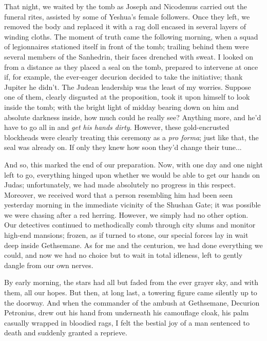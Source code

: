 That night, we waited by the tomb as Joseph and Nicodemus carried out the funeral rites, assisted by some of Yeshua's female followers. Once they left, we removed the body and replaced it with a rag doll encased in several layers of winding cloths. The moment of truth came the following morning, when a squad of legionnaires stationed itself in front of the tomb; trailing behind them were several members of the Sanhedrin, their faces drenched with sweat. I looked on from a distance as they placed a seal on the tomb, prepared to intervene at once if, for example, the ever-eager decurion decided to take the initiative; thank Jupiter he didn't. The Judean leadership was the least of my worries. Suppose one of them, clearly disgusted at the proposition, took it upon himself to look inside the tomb; with the bright light of midday bearing down on him and absolute darkness inside, how much could he really see? Anything more, and he'd have to go all in and \emph{get his hands dirty}. However, these gold-encrusted blockheads were clearly treating this ceremony as a \emph{pro forma}; just like that, the seal was already on. If only they knew how soon they'd change their tune...

And so, this marked the end of our preparation. Now, with one day and one night left to go, everything hinged upon whether we would be able to get our hands on Judas; unfortunately, we had made absolutely no progress in this respect. Moreover, we received word that a person resembling him had been seen yesterday morning in the immediate vicinity of the Shushan Gate; it was possible we were chasing after a red herring. However, we simply had no other option. Our detectives continued to methodically comb through city slums and monitor high-end mansions; frozen, as if turned to stone, our special forces lay in wait deep inside Gethsemane. As for me and the centurion, we had done everything we could, and now we had no choice but to wait in total idleness, left to gently dangle from our own nerves.

By early morning, the stars had all but faded from the ever grayer sky, and with them, all our hopes. But then, at long last, a towering figure came silently up to the doorway. And when the commander of the ambush at Gethsemane, Decurion Petronius, drew out his hand from underneath his camouflage cloak, his palm casually wrapped in bloodied rags, I felt the bestial joy of a man sentenced to death and suddenly granted a reprieve.

